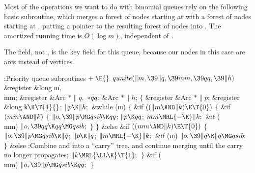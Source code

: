 Most of the operations we want to do with binomial queues rely on
the following basic subroutine, which merges a forest of  nodes
starting at  with a forest of  nodes starting at , putting
a pointer to the resulting forest of  nodes into .
The amortized running time is $O(\log m)$, independent of .

The  field, not , is the key field for this queue,
because our
nodes in this case are arcs instead of vertices.

\Y\B\4:Priority queue subroutines\X${}\mathrel+\E{}$\6
$\\{qunite}(\|m,\39\|q,\39\\{mm},\39\\{qq},\39\|h){}$\1\1\6
\&{register} \&{long} \|m${},{}$ \\{mm};\6
\&{register} \&{Arc} ${}{*}\|q,{}$ ${}{*}\\{qq}{}$;\6
\&{Arc} ${}{*}\|h{}$;\2\2\6
${}\{{}$\5
\1\&{register} \&{Arc} ${}{*}\|p{}$;\6
\&{register} \&{long} \|k${}\K\T{1}{}$;\7
${}\|p\K\|h;{}$\6
\&{while} (\|m)\5
${}\{{}$\1\6
\&{if} ${}((\|m\AND\|k)\E\T{0}){}$\5
${}\{{}$\1\6
\&{if} ${}(\\{mm}\AND\|k){}$\5
${}\{{}$\1\6
${}\|o,\39\|p\MG\\{qsib}\K\\{qq}{}$;\5
${}\|p\K\\{qq}{}$;\5
${}\\{mm}\MRL{-{\K}}\|k;{}$\6
\&{if} (\\{mm})\1\5
${}\|o,\39\\{qq}\K\\{qq}\MG\\{qsib};{}$\2\6
\4${}\}{}$\2\6
\4${}\}{}$\5
\2\&{else} \&{if} ${}((\\{mm}\AND\|k)\E\T{0}){}$\5
${}\{{}$\1\6
${}\|o,\39\|p\MG\\{qsib}\K\|q{}$;\5
${}\|p\K\|q{}$;\5
${}\|m\MRL{-{\K}}\|k;{}$\6
\&{if} (\|m)\1\5
${}\|o,\39\|q\K\|q\MG\\{qsib};{}$\2\6
\4${}\}{}$\5
\2\&{else}\1\5
:Combine  and  into a ``carry'' tree, and continue
merging until the carry no longer propagates\X;\2\6
${}\|k\MRL{{\LL}{\K}}\T{1};{}$\6
\4${}\}{}$\2\6
\&{if} (\\{mm})\1\5
${}\|o,\39\|p\MG\\{qsib}\K\\{qq};{}$\2\6
\4${}\}{}$\2\par
\fi


